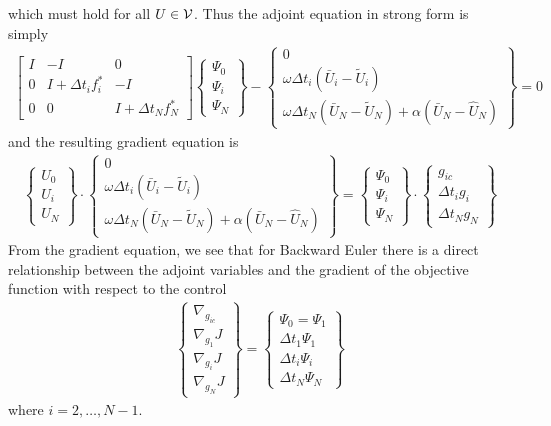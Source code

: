 \documentclass[10pt]{article}
\begin{document}
which must hold for all $U\in{\cal V}$.  Thus the adjoint equation in strong
form is simply
\begin{eqnarray}
\left[ \begin{array}{ccc} 
I & -I & 0 \\
0 & I + \Delta t_i f^*_i & -I \\
0 &  0 & I + \Delta t_N f^*_N
\end{array} \right] 
\left\{\begin{array}{c} \Psi_0 \\ \Psi_i \\ \Psi_N \end{array} \right\} - 
\left\{\begin{array}{c} 
0 \\ 
\omega\Delta t_i (\bar U_i - \tilde U_i) \\ 
\omega\Delta t_N (\bar U_N - \tilde U_N) + \alpha (\bar U_N - \hat U_N)
\end{array}\right\} = 0
\end{eqnarray}
and the resulting gradient equation is
\begin{eqnarray}
\left\{\begin{array}{c} U_0 \\ U_i \\ U_N \end{array}\right\}
\cdot
\left\{\begin{array}{c} 
0 \\ 
\omega\Delta t_i (\bar U_i - \tilde U_i) \\ 
\omega\Delta t_N (\bar U_N - \tilde U_N) + \alpha (\bar U_N - \hat U_N)
\end{array}\right\}
=
\left\{\begin{array}{c} \Psi_0 \\ \Psi_i \\\Psi_N \end{array}\right\}
\cdot
\left\{\begin{array}{c} 
g_{ic} \\ \Delta t_i g_i \\ \Delta t_N g_N \end{array} \right\}
\end{eqnarray}
From the gradient equation, we see that for Backward Euler there is a direct
relationship between the adjoint variables and the gradient of the objective
function with respect to the control
\begin{eqnarray} \label{e:backward_euler_grad}
\left\{\begin{array}{c} 
\nabla_{g_{ic}} \\ \nabla_{g_1} J \\ \nabla_{g_i} J \\ \nabla_{g_N} J 
\end{array}\right\}
= \left\{\begin{array}{c} 
\Psi_0 = \Psi_1 \\
\Delta t_1 \Psi_1 \\ 
\Delta t_{i} \Psi_{i} \\ 
\Delta t_N \Psi_N 
\end{array}\right\}
\end{eqnarray}
where $i=2,\dots,N-1$.
\end{document}
